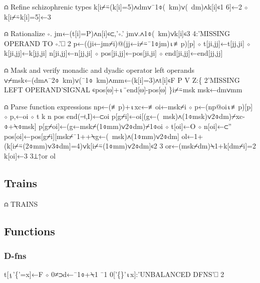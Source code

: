 \documentclass{article}%
\begin{document}
⍝ Refine schizophrenic types
k[i⌿⍨(k[i]=5)∧dm∨¯1⌽(~km)∨(~dm)∧k[i]∊1 6]←2 ⋄ k[i⌿⍨k[i]=5]←3

⍝ Rationalize ∘.
jm←(t[i]=P)∧n[i]∊⊂,'∘.'
jm∨.∧1⌽(~km)∨k[i]∊3 4:'MISSING OPERAND TO ∘.'⎕ 2
p←((ji←jm⌿i)@(jj←i⌿⍨¯1⌽jm)⍳≢p)[p] ⋄ t[ji,jj]←t[jj,ji] ⋄ k[ji,jj]←k[jj,ji]
n[ji,jj]←n[jj,ji] ⋄ pos[ji,jj]←pos[ji,ji] ⋄ end[ji,jj]←end[jj,jj]

⍝ Mask and verify monadic and dyadic operator left operands
∨⌿msk←(dm∧¯2⌽~km)∨(¯1⌽~km)∧mm←(k[i]=3)∧t[i]∊F P V Z:\{
        2'MISSING LEFT OPERAND'SIGNAL ∊pos[⍵]+⍳¨end[⍵]-pos[⍵]
\}i⌿⍨msk
msk←dm∨mm

⍝ Parse function expressions
np←(≢p)+⍳xc←≢oi←msk⌿i ⋄ p←(np@oi⍳≢p)[p] ⋄ p,←oi ⋄ t k n pos end(⊣,I)←⊂oi
p[g⌿i]←oi[(g←(~msk)∧(1⌽msk)∨2⌽dm)⌿xc-⌽+⍀⌽msk]
p[g⌿oi]←(g←msk⌿(1⌽mm)∨2⌽dm)⌿1⌽oi ⋄ t[oi]←O ⋄ n[oi]←⊂''
pos[oi]←pos[g⌿i][msk⌿¯1++⍀g←(~msk)∧(1⌽mm)∨2⌽dm]
ol←1+(k[i⌿⍨(2⌽mm)∨3⌽dm]=4)∨k[i⌿⍨(1⌽mm)∨2⌽dm]∊2 3
or←(msk⌿dm)⍀1+k[dm⌿i]=2
k[oi]←3 3⊥↑or ol
\nwendcode{}\nwdocspar

\subsection{Trains}

\nwenddocs{}\endmoddef\nwstartdeflinemarkup{}\nwenddeflinemarkup
⍝ TRAINS
\nwendcode{}\nwdocspar

\subsection{Functions}

\subsubsection{D-fns}

\nwenddocs{}\endmoddef\nwstartdeflinemarkup{}\nwenddeflinemarkup
t[⍸'\{'=x]←F ⋄ 0≠⊃d←¯1⌽+⍀1 ¯1 0['\{\}'⍳x]:'UNBALANCED DFNS'⎕ 2
\nwendcode{}\nwdocspar
\end{document}
